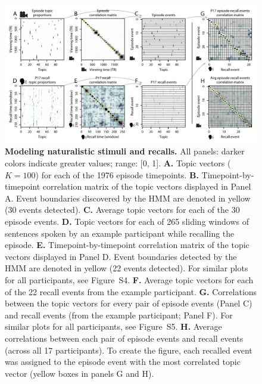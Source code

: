 \documentclass[10pt]{article}
\newcommand{\corrmats}{S4}
\newcommand{\matchmats}{S5}
\begin{document}
\begin{figure}[tp]
\centering
\includegraphics[width=\textwidth]{figs/eventseg}
\caption{\small \textbf{Modeling naturalistic stimuli and recalls.} All panels: darker colors indicate greater values; range: [0, 1].  \textbf{A.} Topic vectors ($K = 100$) for each of the 1976 episode timepoints.  \textbf{B.} Timepoint-by-timepoint correlation matrix of the topic vectors displayed in Panel A.  Event boundaries discovered by the HMM are denoted in yellow (30 events detected).  \textbf{C.} Average topic vectors for each of the 30 episode events. \textbf{D.} Topic vectors for each of 265 sliding windows of sentences spoken by an example participant while recalling the episode.  \textbf{E.} Timepoint-by-timepoint correlation matrix of the topic vectors displayed in Panel D. Event boundaries detected by the HMM are denoted in yellow (22 events detected).  For similar plots for all participants, see Figure~\corrmats.  \textbf{F.} Average topic vectors for each of the 22 recall events from the example participant.  \textbf{G.} Correlations between the topic vectors for every pair of episode events (Panel C) and recall events (from the example participant; Panel F).  For similar plots for all participants, see Figure~\matchmats.  \textbf{H.} Average correlations between each pair of episode events and recall events (across all 17 participants).  To create the figure, each recalled event was assigned to the episode event with the most correlated topic vector (yellow boxes in panels G and H).}
\label{fig:model}
\end{figure}
\end{document}
